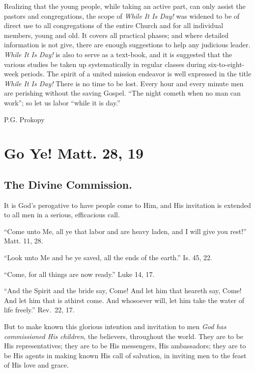 \documentclass[
]{book}
\begin{document}
Realizing that the young people, while taking an active part, can only assist the pastors and congregations, the scope of \emph{While It Is Day!} was widened to be of direct use to all congregations of the entire Church and for all individual members, young and old. It covers all practical phases; and where detailed information is not give, there are enough suggestions to help any judicious leader. \emph{While It Is Day!} is also to serve as a text-book, and it is suggested that the various studies be taken up systematically in regular classes during six-to-eight-week periods. The spirit of a united mission endeavor is well expressed in the title \emph{While It Is Day!} There is no time to be lost. Every hour and every minute men are perishing without the saving Gospel. ``The night cometh when no man can work''; so let us labor ``while it is day.''

P.G. Prokopy

\hypertarget{go-ye-matt.-28-19}{%
\chapter{Go Ye! Matt. 28, 19}\label{go-ye-matt.-28-19}}

\hypertarget{the-divine-commission.}{%
\section*{The Divine Commission.}\label{the-divine-commission.}}

It is God's perogative to have people come to Him, and His invitation is extended to all men in a serious, efficacious call.

``Come unto Me, all ye that labor and are heavy laden, and I will give you rest!'' Matt. 11, 28.

``Look unto Me and be ye saved, all the ends of the earth.'' Is. 45, 22.

``Come, for all things are now ready.'' Luke 14, 17.

``And the Spirit and the bride say, Come! And let him that heareth say, Come! And let him that is athirst come. And whosoever will, let him take the water of life freely.'' Rev.~22, 17.

But to make known this glorious intention and invitation to men \emph{God has commissioned His children}, the believers, throughout the world. They are to be His representatives; they are to be His messengers, His ambassadors; they are to be His agents in making known His call of salvation, in inviting men to the feast of His love and grace.
\end{document}
